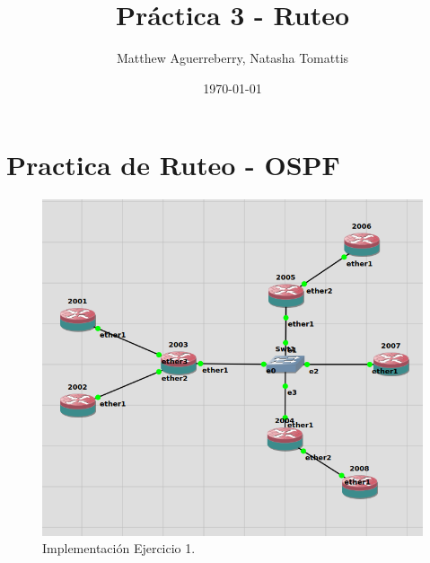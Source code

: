 \documentclass[letterpaper,12pt]{article}
\begin{document}
\title{Práctica 3 - Ruteo}
\author{Matthew Aguerreberry, Natasha Tomattis}
\date{\today}
\maketitle



\section{Practica de Ruteo - OSPF}
	\begin{figure}[ht] 
			
		\centering \includegraphics[width=0.8\columnwidth]{figure/topo_figura1.png}
		\caption{
				\label{fig:samplesetup} %
				Implementación Ejercicio 1.
		}
	\end{figure}
\end{document}
